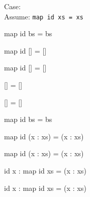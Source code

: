 \documentclass{beamer}
\newcommand{\ca}[1]{{\color{blue}#1}}
\newcommand{\cb}[1]{{\color{violet}#1}}
\newcommand{\cc}[1]{{\color{red}#1}}
\newcommand{\ce}[1]{{\color{green!50!black}#1}}
\begin{document}
\begin{frame}[t,fragile]
\begin{overprint}
Case:\quad{\ce{\Verb?bs = (x:xs)?}} \checkmark \\
Assume: \Verb?map id xs = xs?

\end{overprint}

\vspace{5pt}

\begin{center}
\begin{overprint}

\begin{semiverbatim}
map id \alert<4>{bs} = \alert<4>{bs}
\end{semiverbatim}

\begin{semiverbatim}
map id [] = []
\end{semiverbatim}

\begin{semiverbatim}
map \ca{id} \cb{[]} = []
\end{semiverbatim}

\begin{semiverbatim}
       \cb{[]} = []
\end{semiverbatim}

\begin{semiverbatim}
       \alert<10>{[]} = \alert<10>{[]}
\end{semiverbatim}

\begin{semiverbatim}
map id     \alert<14>{bs}      = \alert<14>{bs}
\end{semiverbatim}

\begin{semiverbatim}
map id (x : xs)    = (x : xs)
\end{semiverbatim}

\begin{semiverbatim}
map \ca{id} (\cb{x} : \cc{xs})    = (x : xs)
\end{semiverbatim}

\begin{semiverbatim}
\ca{id} \cb{x} : map \ca{id} \cc{xs}   = (x : xs)
\end{semiverbatim}

\begin{semiverbatim}
\alert{id x} : map id xs   = (x : xs)
\end{semiverbatim}


\end{overprint}
\end{center}
\end{frame}
\end{document}
